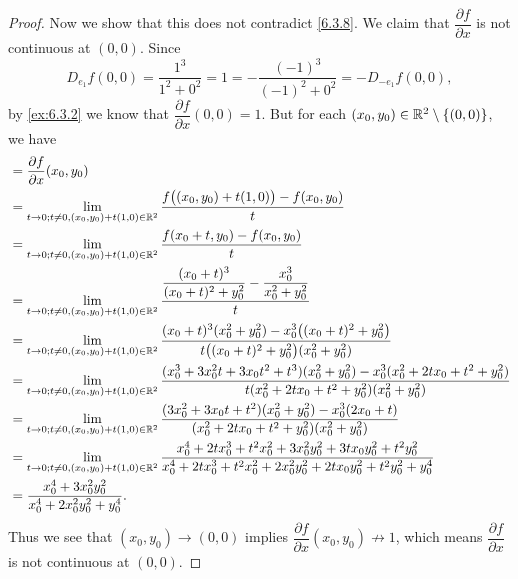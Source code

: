 \begin{proof}
  Now we show that this does not contradict \cref{6.3.8}.
  We claim that \(\dfrac{\partial f}{\partial x}\) is not continuous at \((0, 0)\).
  Since
  \[
    D_{e_1} f(0, 0) = \dfrac{1^3}{1^2 + 0^2} = 1 = -\dfrac{(-1)^3}{(-1)^2 + 0^2} = -D_{-e_1} f(0, 0),
  \]
  by \cref{ex:6.3.2} we know that \(\dfrac{\partial f}{\partial x}(0, 0) = 1\).
  But for each \((x_0, y_0) \in \mathbb{R}^2 \setminus \{(0, 0)\}\), we have
  \begin{align*}
     & = \dfrac{\partial f}{\partial x}(x_0, y_0)                                                                                                                                                                                      \\
     & = \lim_{t \to 0 ; t \neq 0, (x_0, y_0) + t(1, 0) \in \mathbb{R}^2} \dfrac{f\big((x_0, y_0) + t(1, 0)\big) - f(x_0, y_0)}{t}                                                                                                             \\
     & = \lim_{t \to 0 ; t \neq 0, (x_0, y_0) + t(1, 0) \in \mathbb{R}^2} \dfrac{f(x_0 + t, y_0) - f(x_0, y_0)}{t}                                                                                                                             \\
     & = \lim_{t \to 0 ; t \neq 0, (x_0, y_0) + t(1, 0) \in \mathbb{R}^2} \dfrac{\dfrac{(x_0 + t)^3}{(x_0 + t)^2 + y_0^2} - \dfrac{x_0^3}{x_0^2 + y_0^2}}{t}                                                                                   \\
     & = \lim_{t \to 0 ; t \neq 0, (x_0, y_0) + t(1, 0) \in \mathbb{R}^2} \dfrac{(x_0 + t)^3 (x_0^2 + y_0^2) - x_0^3 \big((x_0 + t)^2 + y_0^2\big)}{t \big((x_0 + t)^2 + y_0^2\big) (x_0^2 + y_0^2)}                                           \\
     & = \lim_{t \to 0 ; t \neq 0, (x_0, y_0) + t(1, 0) \in \mathbb{R}^2} \dfrac{(x_0^3 + 3 x_0^2 t + 3 x_0 t^2 + t^3) (x_0^2 + y_0^2) - x_0^3 (x_0^2 + 2 t x_0 + t^2 + y_0^2)}{t (x_0^2 + 2 t x_0 + t^2 + y_0^2) (x_0^2 + y_0^2)}             \\
     & = \lim_{t \to 0 ; t \neq 0, (x_0, y_0) + t(1, 0) \in \mathbb{R}^2} \dfrac{(3 x_0^2 + 3 x_0 t + t^2) (x_0^2 + y_0^2) - x_0^3 (2 x_0 + t)}{(x_0^2 + 2 t x_0 + t^2 + y_0^2) (x_0^2 + y_0^2)}                                               \\
     & = \lim_{t \to 0 ; t \neq 0, (x_0, y_0) + t(1, 0) \in \mathbb{R}^2} \dfrac{x_0^4 + 2 t x_0^3 + t^2 x_0^2 + 3 x_0^2 y_0^2 + 3 t x_0 y_0^2 + t^2 y_0^2}{x_0^4 + 2 t x_0^3 + t^2 x_0^2 + 2 x_0^2 y_0^2 + 2 t x_0 y_0^2 + t^2 y_0^2 + y_0^4} \\
     & = \dfrac{x_0^4 + 3 x_0^2 y_0^2}{x_0^4 + 2 x_0^2 y_0^2 + y_0^4}.
  \end{align*}
  Thus we see that \((x_0, y_0) \to (0, 0)\) implies \(\dfrac{\partial f}{\partial x}(x_0, y_0) \not\to 1\), which means \(\dfrac{\partial f}{\partial x}\) is not continuous at \((0, 0)\).
\end{proof}


